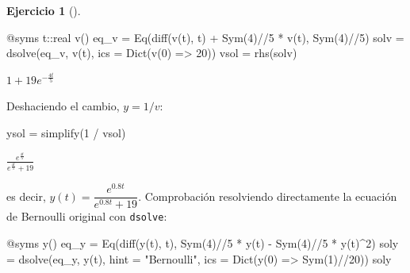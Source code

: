 \documentclass[
  spanish,
  a4paper,
]{scrreport}
\newenvironment{Shaded}{\begin{snugshade}}{\end{snugshade}}
\newcommand{\DataTypeTok}[1]{\textcolor[rgb]{0.68,0.00,0.00}{#1}}
\newcommand{\FloatTok}[1]{\textcolor[rgb]{0.68,0.00,0.00}{#1}}
\newcommand{\FunctionTok}[1]{\textcolor[rgb]{0.28,0.35,0.67}{#1}}
\newcommand{\NormalTok}[1]{\textcolor[rgb]{0.00,0.23,0.31}{#1}}
\newcommand{\OperatorTok}[1]{\textcolor[rgb]{0.37,0.37,0.37}{#1}}
\newcommand{\PreprocessorTok}[1]{\textcolor[rgb]{0.68,0.00,0.00}{#1}}
\newcommand{\StringTok}[1]{\textcolor[rgb]{0.13,0.47,0.30}{#1}}
\theoremstyle{definition}
\newtheorem{exercise}{Ejercicio}[chapter]
\theoremstyle{remark}
\begin{document}
\begin{exercise}[]
\begin{tcolorbox}
\begin{Shaded}
\begin{Highlighting}[]
\PreprocessorTok{@syms}\NormalTok{ t}\OperatorTok{::}\DataTypeTok{real }\FunctionTok{v}\NormalTok{()}
\NormalTok{eq\_v }\OperatorTok{=} \FunctionTok{Eq}\NormalTok{(}\FunctionTok{diff}\NormalTok{(}\FunctionTok{v}\NormalTok{(t), t) }\OperatorTok{+} \FunctionTok{Sym}\NormalTok{(}\FloatTok{4}\NormalTok{)}\OperatorTok{//}\FloatTok{5} \OperatorTok{*} \FunctionTok{v}\NormalTok{(t), }\FunctionTok{Sym}\NormalTok{(}\FloatTok{4}\NormalTok{)}\OperatorTok{//}\FloatTok{5}\NormalTok{)}
\NormalTok{solv }\OperatorTok{=} \FunctionTok{dsolve}\NormalTok{(eq\_v, }\FunctionTok{v}\NormalTok{(t), ics }\OperatorTok{=} \FunctionTok{Dict}\NormalTok{(}\FunctionTok{v}\NormalTok{(}\FloatTok{0}\NormalTok{) }\OperatorTok{=\textgreater{}} \FloatTok{20}\NormalTok{))}
\NormalTok{vsol }\OperatorTok{=} \FunctionTok{rhs}\NormalTok{(solv)}
\end{Highlighting}
\end{Shaded}

$1 + 19 e^{- \frac{4 t}{5}}$

Deshaciendo el cambio, \(y = 1/v\):

\begin{Shaded}
\begin{Highlighting}[]
\NormalTok{ysol }\OperatorTok{=} \FunctionTok{simplify}\NormalTok{(}\FloatTok{1} \OperatorTok{/}\NormalTok{ vsol)}
\end{Highlighting}
\end{Shaded}

$\frac{e^{\frac{4 t}{5}}}{e^{\frac{4 t}{5}} + 19}$

es decir, \(y(t) = \dfrac{e^{0.8t}}{e^{0.8t}+19}\). Comprobación
resolviendo directamente la ecuación de Bernoulli original con
\texttt{dsolve}:

\begin{Shaded}
\begin{Highlighting}[]
\PreprocessorTok{@syms} \FunctionTok{y}\NormalTok{()}
\NormalTok{eq\_y }\OperatorTok{=} \FunctionTok{Eq}\NormalTok{(}\FunctionTok{diff}\NormalTok{(}\FunctionTok{y}\NormalTok{(t), t), }\FunctionTok{Sym}\NormalTok{(}\FloatTok{4}\NormalTok{)}\OperatorTok{//}\FloatTok{5} \OperatorTok{*} \FunctionTok{y}\NormalTok{(t) }\OperatorTok{{-}} \FunctionTok{Sym}\NormalTok{(}\FloatTok{4}\NormalTok{)}\OperatorTok{//}\FloatTok{5} \OperatorTok{*} \FunctionTok{y}\NormalTok{(t)}\OperatorTok{\^{}}\FloatTok{2}\NormalTok{)}
\NormalTok{soly }\OperatorTok{=} \FunctionTok{dsolve}\NormalTok{(eq\_y, }\FunctionTok{y}\NormalTok{(t), hint }\OperatorTok{=} \StringTok{"Bernoulli"}\NormalTok{, ics }\OperatorTok{=} \FunctionTok{Dict}\NormalTok{(}\FunctionTok{y}\NormalTok{(}\FloatTok{0}\NormalTok{) }\OperatorTok{=\textgreater{}} \FunctionTok{Sym}\NormalTok{(}\FloatTok{1}\NormalTok{)}\OperatorTok{//}\FloatTok{20}\NormalTok{))}
\NormalTok{soly}
\end{Highlighting}
\end{Shaded}


\end{tcolorbox}
\end{exercise}
\end{document}
